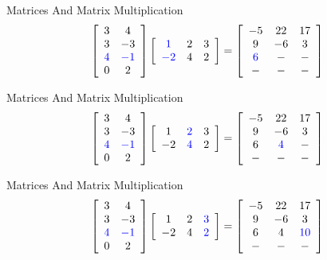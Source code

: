 \begin{frame}{Matrices And Matrix Multiplication}
\[ \left[ \begin{array}{cc} 3 & 4  \\ 3 & -3  \\ \textcolor{blue}{ 4 } & \textcolor{blue}{ -1 }  \\ 0 & 2 \end{array} \right]  \left[ \begin{array}{ccc} \textcolor{blue}{ 1 } & 2 & 3  \\ \textcolor{blue}{ -2 } & 4 & 2 \end{array} \right]   =  \left[ \begin{array}{ccc} -5 & 22 & 17  \\ 9 & -6 & 3  \\ \textcolor{blue}{ 6 } & - & -  \\ - & - & - \end{array} \right]  \]
\end{frame}


\begin{frame}{Matrices And Matrix Multiplication}
\[ \left[ \begin{array}{cc} 3 & 4  \\ 3 & -3  \\ \textcolor{blue}{ 4 } & \textcolor{blue}{ -1 }  \\ 0 & 2 \end{array} \right]  \left[ \begin{array}{ccc} 1 & \textcolor{blue}{ 2 } & 3  \\ -2 & \textcolor{blue}{ 4 } & 2 \end{array} \right]   =  \left[ \begin{array}{ccc} -5 & 22 & 17  \\ 9 & -6 & 3  \\ 6 & \textcolor{blue}{ 4 } & -  \\ - & - & - \end{array} \right]  \]
\end{frame}


\begin{frame}{Matrices And Matrix Multiplication}
\[ \left[ \begin{array}{cc} 3 & 4  \\ 3 & -3  \\ \textcolor{blue}{ 4 } & \textcolor{blue}{ -1 }  \\ 0 & 2 \end{array} \right]  \left[ \begin{array}{ccc} 1 & 2 & \textcolor{blue}{ 3 }  \\ -2 & 4 & \textcolor{blue}{ 2 } \end{array} \right]   =  \left[ \begin{array}{ccc} -5 & 22 & 17  \\ 9 & -6 & 3  \\ 6 & 4 & \textcolor{blue}{ 10 }  \\ - & - & - \end{array} \right]  \]
\end{frame}


